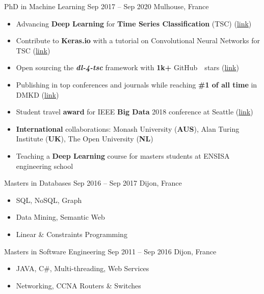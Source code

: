  {PhD in Machine Learning} {Sep 2017 -- Sep 2020} {Mulhouse, France} 

\begin{itemize}
    \item Advancing \textbf{Deep Learning} for \textbf{Time Series Classification} (TSC) (\href{https://github.com/hfawaz/}{link})
    \item Contribute to \textbf{Keras.io} with a tutorial on Convolutional Neural Networks for TSC (\href{https://keras.io/examples/timeseries/timeseries_classification_from_scratch/}{link})
    \item Open sourcing the \textbf{\textit{dl-4-tsc}} framework with \textbf{1k+} GitHub~\githubsymbol~stars (\href{https://github.com/hfawaz/dl-4-tsc/}{link})
    \item Publishing in top conferences and journals while reaching \textbf{\#1 of all time} in DMKD (\href{https://scholar.google.com/citations?hl=en&vq=eng_datamininganalysis&view_op=list_hcore&venue=35Y8BTagp0QJ.2022}{link})
    \item Student travel \textbf{award} for IEEE \textbf{Big Data} 2018 conference at Seattle (\href{http://cci.drexel.edu/bigdata/bigdata2018/StudentTravelAward.html}{link})
    \item \textbf{International} collaborations: Monash University (\textbf{AUS}), Alan Turing Institute (\textbf{UK}), The Open University (\textbf{NL})
    \item Teaching a \textbf{Deep Learning} course for masters students at ENSISA engineering school
\end{itemize}

\divider

 {Masters in Databases} {Sep 2016 -- Sep 2017} {Dijon, France} 
\begin{itemize}
    \item SQL, NoSQL, Graph
    \item Data Mining, Semantic Web
    \item Linear \& Constraints Programming
\end{itemize}

\divider

 {Masters in Software Engineering} {Sep 2011 -- Sep 2016} {Dijon, France} 
\begin{itemize}
    \item JAVA, C\#, Multi-threading, Web Services
    \item Networking, CCNA Routers \& Switches
\end{itemize}



